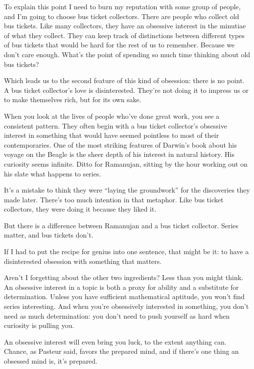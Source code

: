 \documentclass[12pt]{book}
\begin{document}
To explain this point I need to burn my reputation with some group of
people, and I'm going to choose bus ticket collectors. There are people
who collect old bus tickets. Like many collectors, they have an
obsessive interest in the minutiae of what they collect. They can keep
track of distinctions between different types of bus tickets that would
be hard for the rest of us to remember. Because we don't care enough.
What's the point of spending so much time thinking about old bus
tickets?

Which leads us to the second feature of this kind of obsession: there is
no point. A bus ticket collector's love is disinterested. They're not
doing it to impress us or to make themselves rich, but for its own sake.

When you look at the lives of people who've done great work, you see a
consistent pattern. They often begin with a bus ticket collector's
obsessive interest in something that would have seemed pointless to most
of their contemporaries. One of the most striking features of Darwin's
book about his voyage on the Beagle is the sheer depth of his interest
in natural history. His curiosity seems infinite. Ditto for Ramanujan,
sitting by the hour working out on his slate what happens to series.

It's a mistake to think they were ``laying the groundwork'' for the
discoveries they made later. There's too much intention in that
metaphor. Like bus ticket collectors, they were doing it because they
liked it.

But there is a difference between Ramanujan and a bus ticket collector.
Series matter, and bus tickets don't.

If I had to put the recipe for genius into one sentence, that might be
it: to have a disinterested obsession with something that matters.

Aren't I forgetting about the other two ingredients? Less than you might
think. An obsessive interest in a topic is both a proxy for ability and
a substitute for determination. Unless you have sufficient mathematical
aptitude, you won't find series interesting. And when you're obsessively
interested in something, you don't need as much determination: you don't
need to push yourself as hard when curiosity is pulling you.

An obsessive interest will even bring you luck, to the extent anything
can. Chance, as Pasteur said, favors the prepared mind, and if there's
one thing an obsessed mind is, it's prepared.
\end{document}

